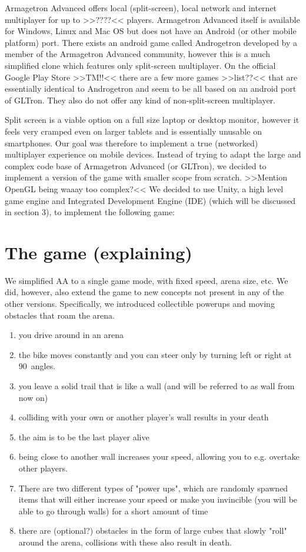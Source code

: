 \documentclass{report}
\begin{document}
Armagetron Advanced offers local (split-screen), local network and internet multiplayer for up to >>????<< players. 
Armagetron Advanced itself is available for Windows, Linux and Mac OS but does not have an Android (or other mobile platform) port. There exists an android game called Androgetron developed by a member of the Armagetron Advanced community, however this is a much simplified clone  which features only split-screen multiplayer. On the official Google Play Store >>TM!!<< there are a few more games >>list??<< that are essentially identical to Androgetron and seem to be all based on an android port of GLTron. They also do not offer any kind of non-split-screen multiplayer.

Split screen is a viable option on a full size laptop or desktop monitor, however it feels very cramped even on larger tablets and is essentially unusable on smartphones.
Our goal was therefore to implement a true (networked) multiplayer experience on mobile devices.
Instead of trying to adapt the large and complex code base of Armagetron Advanced (or GLTron), we decided to implement a version of the game with smaller scope from scratch.
>>Mention OpenGL being waaay too complex?<<
We decided to use Unity, a high level game engine and Integrated Development Engine (IDE) (which will be discussed in section 3), to implement the following game:

\section{The game (explaining) }
We simplified AA to a single game mode, with fixed speed, arena size, etc.
We did, however, also extend the game to new concepts not present in any of the other versions. Specifically, we introduced collectible powerups and moving obstacles that roam the arena.

\begin{enumerate}
  \item you drive around in an arena
  \item the bike moves constantly and you can steer only by turning left or right at 90\textdegree \ angles.
  \item you leave a solid trail that is like a wall (and will be referred to as wall from now on)
  \item colliding with your own or another player's wall results in your death
  \item the aim is to be the last player alive
  \item being close to another wall increases your speed, allowing you to e.g. overtake other players.
  \item There are two different types of "power ups", which are randomly spawned items that will either increase your speed or make you invincible (you will be able to go through walls) for a short amount of time
  \item there are (optional?) obstacles in the form of large cubes that slowly "roll" around the arena, collisions with these also result in death.
 
\end{enumerate}
\end{document}
